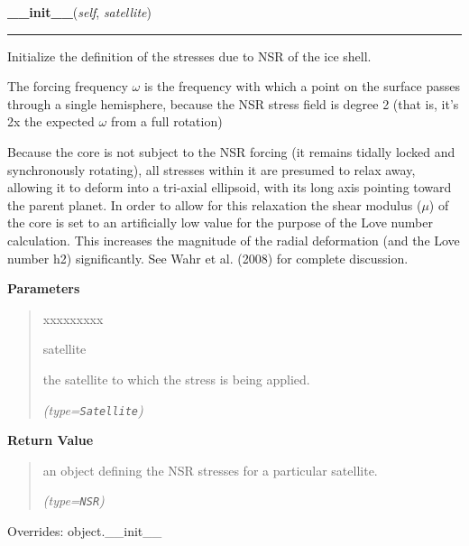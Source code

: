 \hspace{.8\funcindent}\begin{boxedminipage}{\funcwidth}

    \raggedright \textbf{\_\_init\_\_}(\textit{self}, \textit{satellite})

    \vspace{-1.5ex}

    \rule{\textwidth}{0.5\fboxrule}
\setlength{\parskip}{2ex}
    Initialize the definition of the stresses due to NSR of the ice shell.

    The forcing frequency \(\omega\) is the frequency with which a point on
    the surface passes through a single hemisphere, because the NSR stress 
    field is degree 2 (that is, it's 2x the expected \(\omega\) from a full
    rotation)

    Because the core is not subject to the NSR forcing (it remains tidally 
    locked and synchronously rotating), all stresses within it are presumed
    to relax away, allowing it to deform into a tri-axial ellipsoid, with 
    its long axis pointing toward the parent planet.  In order to allow for
    this relaxation the shear modulus (\(\mu\)) of the core is set to an 
    artificially low value for the purpose of the Love number calculation. 
    This increases the magnitude of the radial deformation (and the Love 
    number h2) significantly.  See Wahr et al. (2008) for complete 
    discussion.

\setlength{\parskip}{1ex}
      \textbf{Parameters}
      \vspace{-1ex}

      \begin{quote}
        \begin{Ventry}{xxxxxxxxx}

          \item[satellite]

          the satellite to which the stress is being applied.

            {\it (type=\texttt{Satellite})}

        \end{Ventry}

      \end{quote}

      \textbf{Return Value}
    \vspace{-1ex}

      \begin{quote}
      an object defining the NSR stresses for a particular satellite.

      {\it (type=\texttt{NSR})}

      \end{quote}

      Overrides: object.\_\_init\_\_

    \end{boxedminipage}


